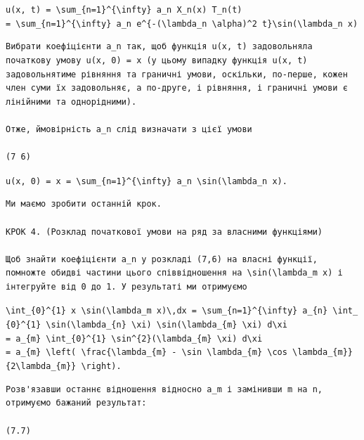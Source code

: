 \documentclass[
  ukrainian,
]{article}
\begin{document}
\texttt{u(x,\ t)\ =\ \textbackslash{}sum\_\{n=1\}\^{}\{\textbackslash{}infty\}\ a\_n\ X\_n(x)\ T\_n(t)}
\texttt{=\ \textbackslash{}sum\_\{n=1\}\^{}\{\textbackslash{}infty\}\ a\_n\ e\^{}\{-(\textbackslash{}lambda\_n\ \textbackslash{}alpha)\^{}2\ t\}\textbackslash{}sin(\textbackslash{}lambda\_n\ x)}

\begin{verbatim}
Вибрати коефіцієнти a_n так, щоб функція u(x, t) задовольняла початкову умову u(x, 0) = x (у цьому випадку функція u(x, t) задовольнятиме рівняння та граничні умови, оскільки, по-перше, кожен член суми їх задовольняє, а по-друге, і рівняння, і граничні умови є лінійними та однорідними).

Отже, ймовірність a_n слід визначати з цієї умови

(7 6)
\end{verbatim}

\texttt{u(x,\ 0)\ =\ x\ =\ \textbackslash{}sum\_\{n=1\}\^{}\{\textbackslash{}infty\}\ a\_n\ \textbackslash{}sin(\textbackslash{}lambda\_n\ x).}

\begin{verbatim}
Ми маємо зробити останній крок.

КРОК 4. (Розклад початкової умови на ряд за власними функціями)

Щоб знайти коефіцієнти a_n у розкладі (7,6) на власні функції, помножте обидві частини цього співвідношення на \sin(\lambda_m x) і інтегруйте від 0 до 1. У результаті ми отримуємо
\end{verbatim}

\texttt{\textbackslash{}int\_\{0\}\^{}\{1\}\ x\ \textbackslash{}sin(\textbackslash{}lambda\_m\ x)\textbackslash{},dx\ =\ \textbackslash{}sum\_\{n=1\}\^{}\{\textbackslash{}infty\}\ a\_\{n\}\ \textbackslash{}int\_\{0\}\^{}\{1\}\ \textbackslash{}sin(\textbackslash{}lambda\_\{n\}\ \textbackslash{}xi)\ \textbackslash{}sin(\textbackslash{}lambda\_\{m\}\ \textbackslash{}xi)\ d\textbackslash{}xi}
\texttt{=\ a\_\{m\}\ \textbackslash{}int\_\{0\}\^{}\{1\}\ \textbackslash{}sin\^{}\{2\}(\textbackslash{}lambda\_\{m\}\ \textbackslash{}xi)\ d\textbackslash{}xi}
\texttt{=\ a\_\{m\}\ \textbackslash{}left(\ \textbackslash{}frac\{\textbackslash{}lambda\_\{m\}\ -\ \textbackslash{}sin\ \textbackslash{}lambda\_\{m\}\ \textbackslash{}cos\ \textbackslash{}lambda\_\{m\}\}\{2\textbackslash{}lambda\_\{m\}\}\ \textbackslash{}right).}

\begin{verbatim}
Розв'язавши останнє відношення відносно a_m і замінивши m на n, отримуємо бажаний результат:

(7.7)
\end{verbatim}
\end{document}
